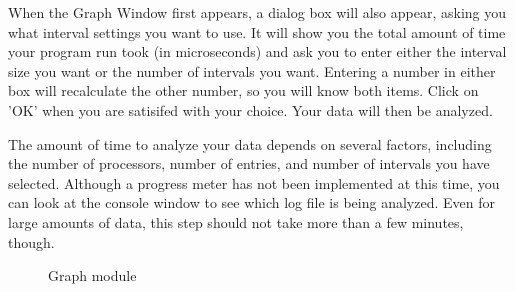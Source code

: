 \documentclass[10pt,dvips]{article}
\begin{document}
When the Graph Window first appears, a dialog box will also appear,
asking you what interval settings you want to use.  It will show you
the total amount of time your program run took (in microseconds) and
ask you to enter either the interval size you want or the number of
intervals you want.  Entering a number in either box will recalculate
the other number, so you will know both items. Click on 'OK' when you
are satisifed with your choice.  Your data will then be analyzed.

The amount of time to analyze your data depends on several factors,
including the number of processors, number of entries, and number of
intervals you have selected.  Although a progress meter has not been
implemented at this time, you can look at the console window to see
which log file is being analyzed.  Even for large amounts of data,
this step should not take more than a few minutes, though.

\begin{figure}[htb]
\center 
{}
\caption{Graph module}
\label{graph}
\end{figure}
\end{document}
